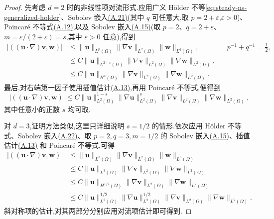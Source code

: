 \begin{proof}
先考虑 $d=2$ 时的非线性项对流形式.应用广义 Hölder 不等\cref{eq:steady-ns-generalized-holder}、Sobolev 嵌入\hyperref[eq:appendix-a-21]{(A.21)}(其中 $q$ 可任意大,取 $p=2+\varepsilon$,$\varepsilon>0$)、Poincaré 不等式\hyperref[eq:appendix-a-12]{(A.12)},以及 Sobolev 嵌入\hyperref[eq:appendix-a-15]{(A.15)}(取 $p=2$、$q=2+\varepsilon$、$m=\varepsilon/(2+\varepsilon)=s$,其中 $\varepsilon>0$ 任意),得到
\[
\begin{aligned}
 |((\bm{u}\cdot\nabla)\bm{v},\bm{w})|
  &\le\|\bm{u}\|_{L^p(\Omega)}
      \|\nabla\bm{v}\|_{L^2(\Omega)}
      \|\bm{w}\|_{L^q(\Omega)},
      &&p^{-1}+q^{-1}=\frac12,\\
  &\le C\|\bm{u}\|_{L^{2+\varepsilon}(\Omega)}
      \|\nabla\bm{v}\|_{L^2(\Omega)}
      \|\nabla\bm{w}\|_{L^2(\Omega)},\\
  &\le C\|\bm{u}\|_{H^s(\Omega)}
      \|\nabla\bm{v}\|_{L^2(\Omega)}
      \|\nabla\bm{w}\|_{L^2(\Omega)}.
\end{aligned}
\]
最后,对右端第一因子使用插值估计\hyperref[eq:appendix-a-13]{(A.13)},再用 Poincaré 不等式,便得到
\[
  |((\bm{u}\cdot\nabla)\bm{v},\bm{w})|
   \le C\|\bm{u}\|_{L^2(\Omega)}^{1-s}
       \|\nabla\bm{u}\|_{L^2(\Omega)}^s
       \|\nabla\bm{v}\|_{L^2(\Omega)}
       \|\nabla\bm{w}\|_{L^2(\Omega)},
\]
其中任意小的正数 $s$ 均可取.

对 $d=3$,证明方法类似,这里只详细说明 $s=1/2$ 的情形.依次应用 Hölder 不等式、Sobolev 嵌入\hyperref[eq:appendix-a-22]{(A.22)}、取 $p=2,q=3,m=1/2$ 的 Sobolev 嵌入\hyperref[eq:appendix-a-15]{(A.15)}、插值估计\hyperref[eq:appendix-a-13]{(A.13)} 和 Poincaré 不等式,可得
\[
\begin{aligned}
  |((\bm{u}\cdot\nabla)\bm{v},\bm{w})|
   &\le\|\bm{u}\|_{L^3(\Omega)}
        \|\nabla\bm{v}\|_{L^2(\Omega)}
        \|\bm{w}\|_{L^6(\Omega)}\\
   &\le C\|\bm{u}\|_{L^3(\Omega)}
        \|\nabla\bm{v}\|_{L^2(\Omega)}
        \|\nabla\bm{w}\|_{L^2(\Omega)}\\
   &\le C\|\bm{u}\|_{H^{1/2}(\Omega)}
        \|\nabla\bm{v}\|_{L^2(\Omega)}
        \|\nabla\bm{w}\|_{L^2(\Omega)}\\
   &\le C\|\bm{u}\|_{L^2(\Omega)}^{1/2}
        \|\nabla\bm{u}\|_{L^2(\Omega)}^{1/2}
        \|\nabla\bm{v}\|_{L^2(\Omega)}
        \|\nabla\bm{w}\|_{L^2(\Omega)}.
\end{aligned}
\]
斜对称项的估计,对其两部分分别应用对流项估计即可得到.
\end{proof}

